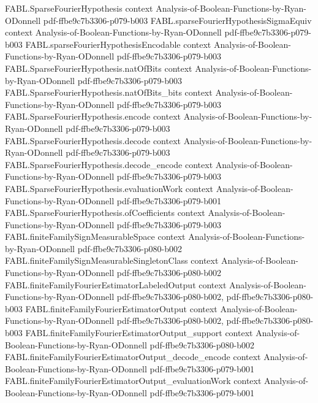 \begin{theorem}
  {FABL.SparseFourierHypothesis}
  {context}
  {Analysis-of-Boolean-Functions-by-Ryan-ODonnell}
  {pdf-ffbe9c7b3306-p079-b003}
\proofstep
  {FABL.sparseFourierHypothesisSigmaEquiv}
  {context}
  {Analysis-of-Boolean-Functions-by-Ryan-ODonnell}
  {pdf-ffbe9c7b3306-p079-b003}
\proofstep
  {FABL.sparseFourierHypothesisEncodable}
  {context}
  {Analysis-of-Boolean-Functions-by-Ryan-ODonnell}
  {pdf-ffbe9c7b3306-p079-b003}
\proofstep
  {FABL.SparseFourierHypothesis.natOfBits}
  {context}
  {Analysis-of-Boolean-Functions-by-Ryan-ODonnell}
  {pdf-ffbe9c7b3306-p079-b003}
\proofstep
  {FABL.SparseFourierHypothesis.natOfBits_bits}
  {context}
  {Analysis-of-Boolean-Functions-by-Ryan-ODonnell}
  {pdf-ffbe9c7b3306-p079-b003}
\proofstep
  {FABL.SparseFourierHypothesis.encode}
  {context}
  {Analysis-of-Boolean-Functions-by-Ryan-ODonnell}
  {pdf-ffbe9c7b3306-p079-b003}
\proofstep
  {FABL.SparseFourierHypothesis.decode}
  {context}
  {Analysis-of-Boolean-Functions-by-Ryan-ODonnell}
  {pdf-ffbe9c7b3306-p079-b003}
\proofstep
  {FABL.SparseFourierHypothesis.decode_encode}
  {context}
  {Analysis-of-Boolean-Functions-by-Ryan-ODonnell}
  {pdf-ffbe9c7b3306-p079-b003}
\proofstep
  {FABL.SparseFourierHypothesis.evaluationWork}
  {context}
  {Analysis-of-Boolean-Functions-by-Ryan-ODonnell}
  {pdf-ffbe9c7b3306-p079-b001}
\proofstep
  {FABL.SparseFourierHypothesis.ofCoefficients}
  {context}
  {Analysis-of-Boolean-Functions-by-Ryan-ODonnell}
  {pdf-ffbe9c7b3306-p079-b003}
\proofstep
  {FABL.finiteFamilySignMeasurableSpace}
  {context}
  {Analysis-of-Boolean-Functions-by-Ryan-ODonnell}
  {pdf-ffbe9c7b3306-p080-b002}
\proofstep
  {FABL.finiteFamilySignMeasurableSingletonClass}
  {context}
  {Analysis-of-Boolean-Functions-by-Ryan-ODonnell}
  {pdf-ffbe9c7b3306-p080-b002}
\proofstep
  {FABL.finiteFamilyFourierEstimatorLabeledOutput}
  {context}
  {Analysis-of-Boolean-Functions-by-Ryan-ODonnell}
  {pdf-ffbe9c7b3306-p080-b002,
    pdf-ffbe9c7b3306-p080-b003}
\proofstep
  {FABL.finiteFamilyFourierEstimatorOutput}
  {context}
  {Analysis-of-Boolean-Functions-by-Ryan-ODonnell}
  {pdf-ffbe9c7b3306-p080-b002,
    pdf-ffbe9c7b3306-p080-b003}
\proofstep
  {FABL.finiteFamilyFourierEstimatorOutput_support}
  {context}
  {Analysis-of-Boolean-Functions-by-Ryan-ODonnell}
  {pdf-ffbe9c7b3306-p080-b002}
\proofstep
  {FABL.finiteFamilyFourierEstimatorOutput_decode_encode}
  {context}
  {Analysis-of-Boolean-Functions-by-Ryan-ODonnell}
  {pdf-ffbe9c7b3306-p079-b001}
\proofstep
  {FABL.finiteFamilyFourierEstimatorOutput_evaluationWork}
  {context}
  {Analysis-of-Boolean-Functions-by-Ryan-ODonnell}
  {pdf-ffbe9c7b3306-p079-b001}

\end{theorem}
